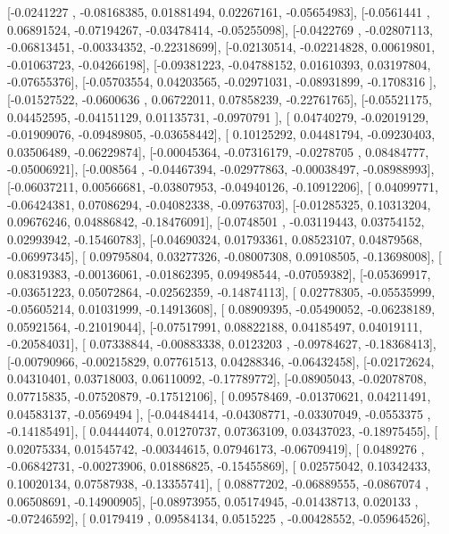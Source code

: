 \documentclass{article}
\begin{document}
       [-0.0241227 , -0.08168385,  0.01881494,  0.02267161, -0.05654983],
       [-0.0561441 ,  0.06891524, -0.07194267, -0.03478414, -0.05255098],
       [-0.0422769 , -0.02807113, -0.06813451, -0.00334352, -0.22318699],
       [-0.02130514, -0.02214828,  0.00619801, -0.01063723, -0.04266198],
       [-0.09381223, -0.04788152,  0.01610393,  0.03197804, -0.07655376],
       [-0.05703554,  0.04203565, -0.02971031, -0.08931899, -0.1708316 ],
       [-0.01527522, -0.0600636 ,  0.06722011,  0.07858239, -0.22761765],
       [-0.05521175,  0.04452595, -0.04151129,  0.01135731, -0.0970791 ],
       [ 0.04740279, -0.02019129, -0.01909076, -0.09489805, -0.03658442],
       [ 0.10125292,  0.04481794, -0.09230403,  0.03506489, -0.06229874],
       [-0.00045364, -0.07316179, -0.0278705 ,  0.08484777, -0.05006921],
       [-0.008564  , -0.04467394, -0.02977863, -0.00038497, -0.08988993],
       [-0.06037211,  0.00566681, -0.03807953, -0.04940126, -0.10912206],
       [ 0.04099771, -0.06424381,  0.07086294, -0.04082338, -0.09763703],
       [-0.01285325,  0.10313204,  0.09676246,  0.04886842, -0.18476091],
       [-0.0748501 , -0.03119443,  0.03754152,  0.02993942, -0.15460783],
       [-0.04690324,  0.01793361,  0.08523107,  0.04879568, -0.06997345],
       [ 0.09795804,  0.03277326, -0.08007308,  0.09108505, -0.13698008],
       [ 0.08319383, -0.00136061, -0.01862395,  0.09498544, -0.07059382],
       [-0.05369917, -0.03651223,  0.05072864, -0.02562359, -0.14874113],
       [ 0.02778305, -0.05535999, -0.05605214,  0.01031999, -0.14913608],
       [ 0.08909395, -0.05490052, -0.06238189,  0.05921564, -0.21019044],
       [-0.07517991,  0.08822188,  0.04185497,  0.04019111, -0.20584031],
       [ 0.07338844, -0.00883338,  0.0123203 , -0.09784627, -0.18368413],
       [-0.00790966, -0.00215829,  0.07761513,  0.04288346, -0.06432458],
       [-0.02172624,  0.04310401,  0.03718003,  0.06110092, -0.17789772],
       [-0.08905043, -0.02078708,  0.07715835, -0.07520879, -0.17512106],
       [ 0.09578469, -0.01370621,  0.04211491,  0.04583137, -0.0569494 ],
       [-0.04484414, -0.04308771, -0.03307049, -0.0553375 , -0.14185491],
       [ 0.04444074,  0.01270737,  0.07363109,  0.03437023, -0.18975455],
       [ 0.02075334,  0.01545742, -0.00344615,  0.07946173, -0.06709419],
       [ 0.0489276 , -0.06842731, -0.00273906,  0.01886825, -0.15455869],
       [ 0.02575042,  0.10342433,  0.10020134,  0.07587938, -0.13355741],
       [ 0.08877202, -0.06889555, -0.0867074 ,  0.06508691, -0.14900905],
       [-0.08973955,  0.05174945, -0.01438713,  0.020133  , -0.07246592],
       [ 0.0179419 ,  0.09584134,  0.0515225 , -0.00428552, -0.05964526],
\end{document}
